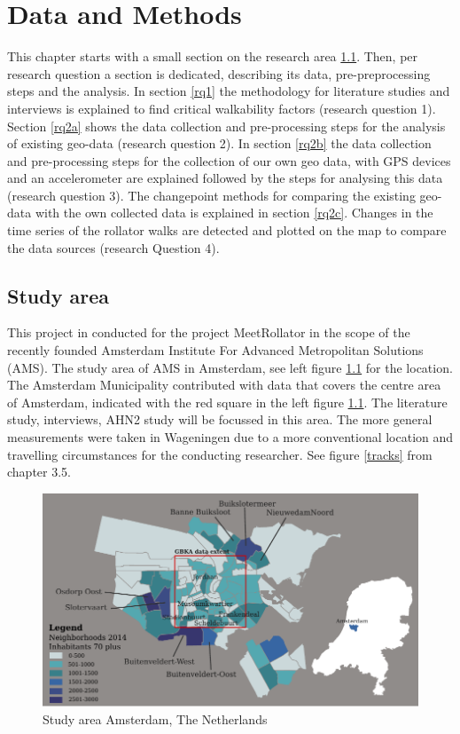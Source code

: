 \chapter[Data and Methods]{Data and Methods}

This chapter starts with a small section on the research area \ref{area}.
Then, per research question a section is dedicated, describing its data, pre-preprocessing steps and the analysis. In section \ref{rq1} the methodology for literature studies and interviews is explained to find critical walkability factors (research question 1). Section \ref{rq2a} shows the data collection and pre-processing steps for the analysis of existing geo-data (research question 2). 
In section \ref{rq2b} the data collection and pre-processing steps for the collection of our own geo data, with GPS devices and an accelerometer are explained followed by the steps for analysing this data (research question 3). The changepoint methods for comparing the existing geo-data with the own collected data is explained in section \ref{rq2c}. Changes in the time series of the rollator walks are detected and plotted on the map to compare the data sources (research Question 4).

\clearpage
\section{Study area}\label{area}
This project in conducted for the project MeetRollator in the scope of the recently founded Amsterdam Institute For Advanced Metropolitan Solutions (AMS). The study area of AMS in Amsterdam, see left figure \ref{kaart} for the location. The Amsterdam Municipality contributed with data that covers the centre area of Amsterdam, indicated with the red square in the left figure \ref{kaart}. 
The literature study, interviews, AHN2 study will be focussed in this area. The more general measurements were taken in Wageningen due to a more conventional location and travelling circumstances for the conducting researcher. See figure \ref{tracks} from chapter 3.5. 

\begin{figure}[h]
\includegraphics[width=\textwidth]{img/M1_StudyArea.pdf}
\centering
\caption{Study area Amsterdam, The Netherlands\label{kaart}}
\end{figure}

